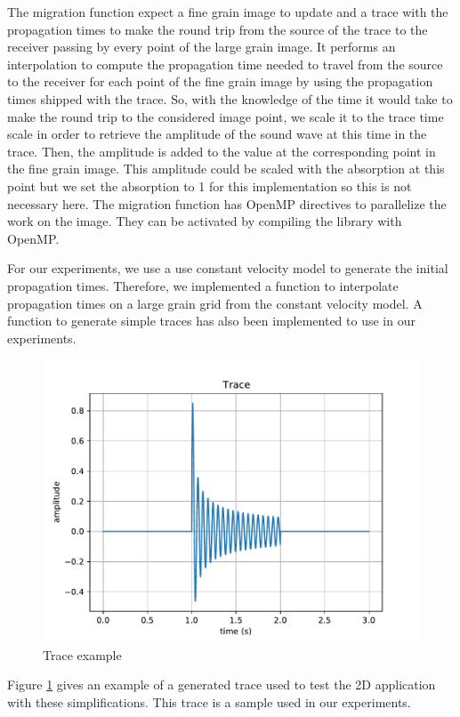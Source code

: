 The migration function expect a fine grain image to update and a trace with the propagation times to make the round trip from the source of the trace to the receiver passing by every point of the large grain image.
It performs an interpolation to compute the propagation time needed to travel from the source to the receiver for each point of the fine grain image by using the propagation times shipped with the trace.
So, with the knowledge of the time it would take to make the round trip to the considered image point, we scale it to the trace time scale in order to retrieve the amplitude of the sound wave at this time in the trace.
Then, the amplitude is added to the value at the corresponding point in the fine grain image.
This amplitude could be scaled with the absorption at this point but we set the absorption to 1 for this implementation so this is not necessary here.
The migration function has OpenMP directives to parallelize the work on the image.
They can be activated by compiling the library with OpenMP.

For our experiments, we use a use constant velocity model to generate the initial propagation times.
Therefore, we implemented a function to interpolate propagation times on a large grain grid from the constant velocity model.
A function to generate simple traces has also been implemented to use in our experiments.

\begin{figure}[h]
	\centering
	\includegraphics[width=.7\textwidth]{trace.pdf}
	\caption{Trace example\label{fig:kirchhoff_trace}}
\end{figure}

Figure \ref{fig:kirchhoff_trace} gives an example of a generated trace used to test the 2D application with these simplifications.
This trace is a sample used in our experiments.

